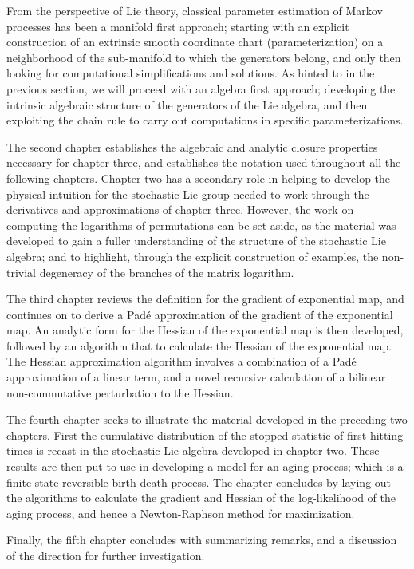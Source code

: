 From the perspective of Lie theory, classical parameter estimation of Markov processes has
been a manifold first approach; starting with an explicit construction of an extrinsic
smooth coordinate chart (parameterization) on a neighborhood of the sub-manifold to which
the generators belong, and only then looking for computational simplifications and
solutions. As hinted to in the previous section, we will proceed with an algebra first
approach; developing the intrinsic algebraic structure of the generators of the Lie algebra,
and then exploiting the chain rule to carry out computations in specific parameterizations.

The second chapter establishes the algebraic and analytic closure properties necessary for 
chapter three, and establishes the notation used throughout all the following chapters.
Chapter two has a secondary role in helping to develop the physical intuition for the 
stochastic Lie group needed to work through the derivatives and approximations of chapter 
three. However, the work on computing the logarithms of permutations can be set aside, as 
the material was developed to gain a fuller understanding of the structure of the stochastic 
Lie algebra; and to highlight, through the explicit construction of examples, the
non-trivial degeneracy of the branches of the matrix logarithm.

The third chapter reviews the definition for the gradient of exponential map, and continues
on to derive a Pad\'{e} approximation of the gradient of the exponential map. An analytic
form for the Hessian of the exponential map is then developed, followed by an algorithm that
to calculate the Hessian of the exponential map. The Hessian approximation algorithm
involves a combination of a Pad\'{e} approximation of a linear term, and a novel recursive 
calculation of a bilinear non-commutative perturbation to the Hessian.

The fourth chapter seeks to illustrate the material developed in the preceding two chapters.
First the cumulative distribution of the stopped statistic of first hitting times is recast 
in the stochastic Lie algebra developed in chapter two. These results are then put to use in
developing a model for an aging process; which is a finite state reversible birth-death
process. The chapter concludes by laying out the algorithms to calculate the gradient and
Hessian of the log-likelihood of the aging process, and hence a Newton-Raphson method for
maximization.

Finally, the fifth chapter concludes with summarizing remarks, and a discussion of the
direction for further investigation.